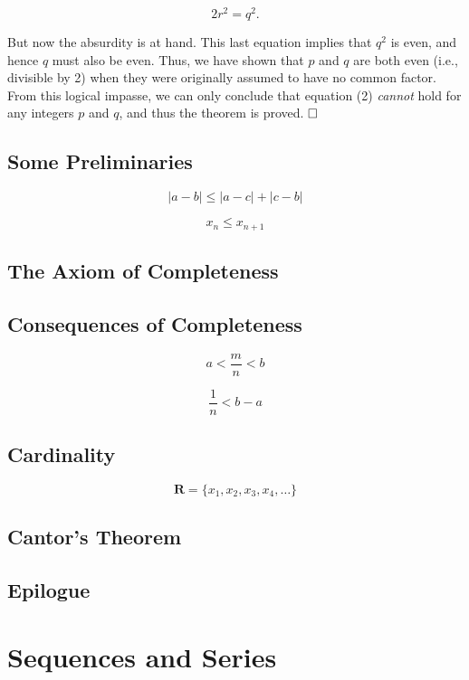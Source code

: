 \documentclass{report}
\numberwithin{equation}{section}
\begin{document}
$$2r^2 = q^2.$$

But now the absurdity is at hand. This last equation implies that $q^2$ is even, and hence $q$ must also be even. Thus, we have shown that $p$ and $q$ are both even (i.e., divisible by 2) when they were originally assumed to have no common factor. From this logical impasse, we can only conclude that equation (2) \emph{cannot} hold for any integers $p$ and $q$, and thus the theorem is proved. $\hfill\square$

\section{Some Preliminaries}

\begin{equation}
    |a-b| \leq |a-c| + |c-b|
\end{equation}

\begin{equation}
    x_n \leq x_{n+1}
\end{equation}

\section{The Axiom of Completeness}

\section{Consequences of Completeness}

\begin{equation}
    a < \frac{m}{n} < b
\end{equation}

\begin{equation}
    \frac{1}{n} < b - a
\end{equation}

\section{Cardinality}

\begin{equation}
    \mathbf{R} = \{x_1,x_2,x_3,x_4,\dots\}
\end{equation}

\section{Cantor's Theorem}

\section{Epilogue}

\chapter{Sequences and Series}
\end{document}
